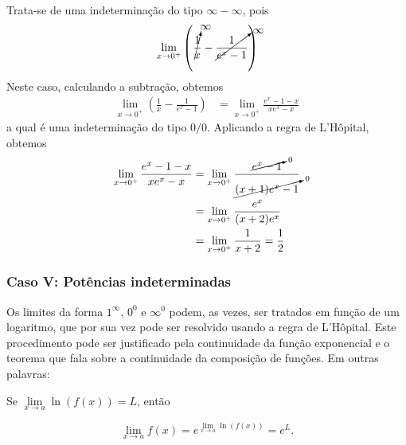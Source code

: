 \cleardoublepage\documentclass[../main.tex]{subfiles}
\begin{document}
\begin{exeresol}
\begin{compactenum}[a)]
\begin{resol}
  Trata-se de uma indeterminação do tipo $\infty - \infty$, pois
  \begin{equation*}
    \lim_{x\to 0^+} \left(\cancelto{\infty}{\frac{1}{x}} - \cancelto{\infty}{\frac{1}{e^x-1}}\right)
  \end{equation*}
  Neste caso, calculando a subtração, obtemos
  \begin{align*}
    \lim_{x\to 0^+} \left(\frac{1}{x} - \frac{1}{e^x-1}\right) &= \lim_{x\to 0^+} \frac{e^x-1-x}{xe^x-x}
  \end{align*}
  a qual é uma indeterminação do tipo $0/0$. Aplicando a regra de L'Hôpital, obtemos
  \begin{align*}
    \lim_{x\to 0^+} \frac{e^x-1-x}{xe^x-x} &= \lim_{x\to 0^+} \frac{\cancelto{0}{e^x-1}}{\cancelto{0}{(x+1)e^x-1}} \\
                                           &= \lim_{x\to 0^+} \frac{e^x}{(x+2)e^x} \\
    &= \lim_{x\to 0^+} \frac{1}{x+2} = \frac{1}{2}
  \end{align*}
\end{resol}
\end{compactenum}
  \end{exeresol}

\subsubsection*{Caso V: Potências indeterminadas}
Os limites da forma \(1^\infty\), \(0^0\) e \(\infty^0\) podem, as vezes, ser tratados em função de um logaritmo, que por sua vez pode ser resolvido usando a regra de L’Hôpital. Este procedimento pode ser justificado pela continuidade da função exponencial e o teorema que fala sobre a continuidade da composição de funções. Em outras palavras:
\begin{framed}
\begin{prop}
Se \(\lim\limits_{x\to a}\ln(f(x))=L\), então

\[ \lim\limits_{x\to a}f(x)=e^{\lim\limits_{x\to a}\ln(f(x))}=e^L. \]
\end{prop}\end{framed}

\end{document}
